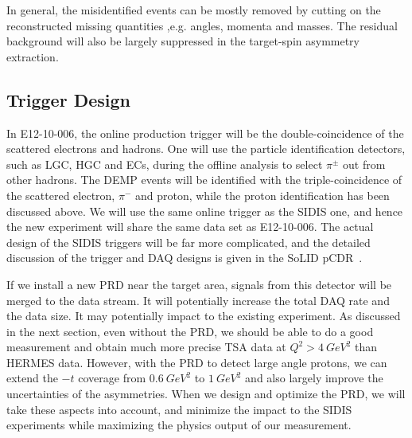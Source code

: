 In general, the misidentified events can be mostly removed by cutting on the reconstructed missing quantities ,e.g. angles, momenta and masses. The residual background will also be largely suppressed in the target-spin asymmetry extraction. 

\subsection{Trigger Design}
In E12-10-006, the online production trigger will be the double-coincidence of
the scattered electrons and hadrons. One will use the particle identification
detectors, such as LGC, HGC and ECs, during the offline analysis to select
$\pi^{\pm}$ out from other hadrons. The DEMP events will be identified with the
triple-coincidence of the scattered electron, $\pi^{-}$ and proton, while the proton identification has been discussed above. We
will use the same online trigger as the SIDIS one, and hence the new experiment
will share the same data set as E12-10-006. The actual design of the SIDIS triggers will be far more complicated, and the detailed discussion of the trigger and DAQ designs is given in the SoLID pCDR~\cite{solid_pcdr}.

If we install a new PRD near the target area, signals from this detector will be merged to the data stream. It will potentially increase the total DAQ rate and the data size. It may potentially impact to the existing experiment.  As discussed in the next section, even without the PRD, we should be able to do a good measurement and obtain much more precise TSA data at $Q^{2}>4~GeV^{2}$ than HERMES data. However, with the PRD to detect large angle protons, we can extend the $-t$ coverage from $0.6~GeV^{2}$ to $1~GeV^{2}$ and also largely improve the uncertainties of the asymmetries. When we design and optimize the PRD, we will take these aspects into account, and minimize the impact to the SIDIS experiments while maximizing the physics output of our measurement.